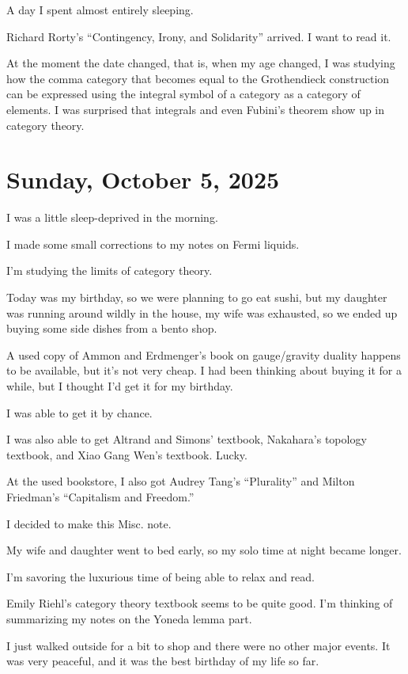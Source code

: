 \documentclass[uplatex]{jsarticle}
\begin{document}
A day I spent almost entirely sleeping.

Richard Rorty's ``Contingency, Irony, and Solidarity'' arrived. I want to read it.

At the moment the date changed, that is, when my age changed, I was studying how the comma category that becomes equal to the Grothendieck construction can be expressed using the integral symbol of a category as a category of elements.
I was surprised that integrals and even Fubini's theorem show up in category theory.


\section{\textbf{Sunday, October 5, 2025}}

I was a little sleep-deprived in the morning.

I made some small corrections to my notes on Fermi liquids.

I'm studying the limits of category theory.

Today was my birthday, so we were planning to go eat sushi, but my daughter was running around wildly in the house, my wife was exhausted, so we ended up buying some side dishes from a bento shop.

A used copy of Ammon and Erdmenger's book on gauge/gravity duality happens to be available, but it's not very cheap.
I had been thinking about buying it for a while, but I thought I'd get it for my birthday.

I was able to get it by chance.

I was also able to get Altrand and Simons' textbook, Nakahara's topology textbook, and Xiao Gang Wen's textbook.
Lucky.

At the used bookstore, I also got Audrey Tang's ``Plurality'' and Milton Friedman's ``Capitalism and Freedom.''

I decided to make this Misc. note.

My wife and daughter went to bed early, so my solo time at night became longer.

I'm savoring the luxurious time of being able to relax and read.

Emily Riehl's category theory textbook seems to be quite good.
I'm thinking of summarizing my notes on the Yoneda lemma part.

I just walked outside for a bit to shop and there were no other major events. It was very peaceful, and it was the best birthday of my life so far.
\end{document}
